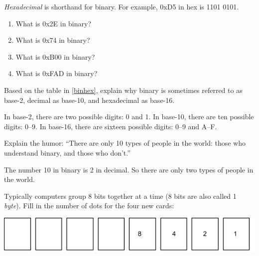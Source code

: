 \Q \emph{Hexadecimal} is shorthand for binary. For example, 0xD5 in hex is 1101 0101.

\setlength{\defaultwidth}{10em}

\begin{enumerate}
\item What is 0x2E in binary? 
\item What is 0x74 in binary? 
\item What is 0xB00 in binary? 
\item What is 0xFAD in binary? 
\end{enumerate}


\Q Based on the table in \ref{binhex}, explain why binary is sometimes referred to as base-2, decimal as base-10, and hexadecimal as base-16.

\begin{answer}
In base-2, there are two possible digits: 0 and 1.
In base-10, there are ten possible digits: 0--9.
In base-16, there are sixteen possible digits: 0--9 and A--F.
\end{answer}


\Q Explain the humor: ``There are only 10 types of people in the world: those who understand binary, and those who don't.''

\begin{answer}
The number 10 in binary is 2 in decimal.
So there are only two types of people in the world.
\end{answer}


\Q Typically computers group 8 bits together at a time (8 bits are also called 1 \emph{byte}).
Fill in the number of dots for the four new cards:

\begin{center}
\includegraphics[width=\textwidth]{binary5.png}
\end{center}

\setlength{\defaultwidth}{2em}

\vspace{-5em}
\hspace{1.0em}
\hspace{2.5em}
\hspace{2.5em}
\hspace{2.5em}
\vspace{3em}


